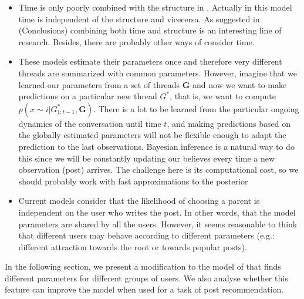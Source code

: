 \documentclass[smallextended]{svjour3}          %
\begin{document}
\begin{itemize}
	\item Time is only poorly combined with the structure in \cite{Wang2012e}. Actually in this model time is independent of the structure and vicecersa. As suggested in \cite{Gomez2012} (Conclusions) combining both time and structure is an interesting line of research. Besides, there are probably other ways of consider time.
	
	\item These models estimate their parameters once and therefore very different threads are summarized with common parameters. However, imagine that we learned our parameters from a set of threads $\mathbf{G}$ and now we want to make predictions on a particular new thread $G^*$, that is, we want to compute $p(x \sim i | G_{1:t-1}^*, \mathbf{G})$. There is a lot to be learned from the particular ongoing dynamics of the conversation until time $t$, and making predictions based on the globally estimated parameters will not be flexible enough to adapt the prediction to the last observations. Bayesian inference is a natural way to do this since we will be constantly updating our believes every time a new observation (post) arrives. The challenge here is its computational cost, so we should probably work with fast approximations to the posterior

	\item Current models consider that the likelihood of choosing a parent is independent on the user who writes the post. In other words, that the model parameters are shared by all the users. However, it seems reasonable to think that different users may behave according to different parameters (e.g.: different attraction towards the root or towards popular posts).
\end{itemize}

In the following section, we present a modification to the model of \citep{Gomez2012} that finds different parameters for different groups of users. We also analyse whether this feature can improve the model when used for a task of post recommendation. 
\end{document}
